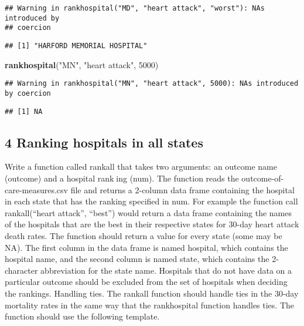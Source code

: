 \documentclass[
]{article}
\newenvironment{Shaded}{\begin{snugshade}}{\end{snugshade}}
\newcommand{\DecValTok}[1]{\textcolor[rgb]{0.00,0.00,0.81}{#1}}
\newcommand{\FunctionTok}[1]{\textcolor[rgb]{0.13,0.29,0.53}{\textbf{#1}}}
\newcommand{\NormalTok}[1]{#1}
\newcommand{\StringTok}[1]{\textcolor[rgb]{0.31,0.60,0.02}{#1}}
\begin{document}
\begin{verbatim}
## Warning in rankhospital("MD", "heart attack", "worst"): NAs introduced by
## coercion
\end{verbatim}

\begin{verbatim}
## [1] "HARFORD MEMORIAL HOSPITAL"
\end{verbatim}

\begin{Shaded}
\begin{Highlighting}[]
\FunctionTok{rankhospital}\NormalTok{(}\StringTok{"MN"}\NormalTok{, }\StringTok{"heart attack"}\NormalTok{, }\DecValTok{5000}\NormalTok{)}
\end{Highlighting}
\end{Shaded}

\begin{verbatim}
## Warning in rankhospital("MN", "heart attack", 5000): NAs introduced by coercion
\end{verbatim}

\begin{verbatim}
## [1] NA
\end{verbatim}

\subsection{4 Ranking hospitals in all
states}\label{ranking-hospitals-in-all-states}

Write a function called rankall that takes two arguments: an outcome
name (outcome) and a hospital ranking (num). The function reads the
outcome-of-care-measures.csv file and returns a 2-column data frame
containing the hospital in each state that has the ranking specified in
num. For example the function call rankall(``heart attack'', ``best'')
would return a data frame containing the names of the hospitals that are
the best in their respective states for 30-day heart attack death rates.
The function should return a value for every state (some may be NA). The
first column in the data frame is named hospital, which contains the
hospital name, and the second column is named state, which contains the
2-character abbreviation for the state name. Hospitals that do not have
data on a particular outcome should be excluded from the set of
hospitals when deciding the rankings. Handling ties. The rankall
function should handle ties in the 30-day mortality rates in the same
way that the rankhospital function handles ties. The function should use
the following template.
\end{document}
